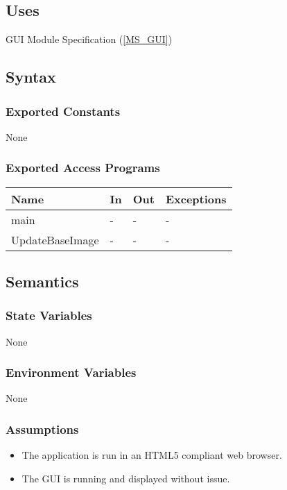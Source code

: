 \documentclass[12pt, titlepage]{article}
\newcommand{\msref}[1]{Module Specification (\ref{#1})}
\begin{document}
\subsection{Uses}
GUI \msref{MS_GUI}

\subsection{Syntax}

\subsubsection{Exported Constants}
None

\subsubsection{Exported Access Programs}

\begin{center}
\begin{tabular}{L{2cm} L{4cm} L{4cm} L{2cm}}
\hline
\textbf{Name} & \textbf{In} & \textbf{Out} & \textbf{Exceptions} \\
\hline
main & - & - & - \\
UpdateBaseImage & - & - & - \\
\hline
\end{tabular}
\end{center}

\subsection{Semantics}

\subsubsection{State Variables}
None

\subsubsection{Environment Variables}
None

\subsubsection{Assumptions}
\begin{itemize}
  \item The application is run in an HTML5 compliant web browser.
  \item The GUI is running and displayed without issue.
\end{itemize}
\end{document}
